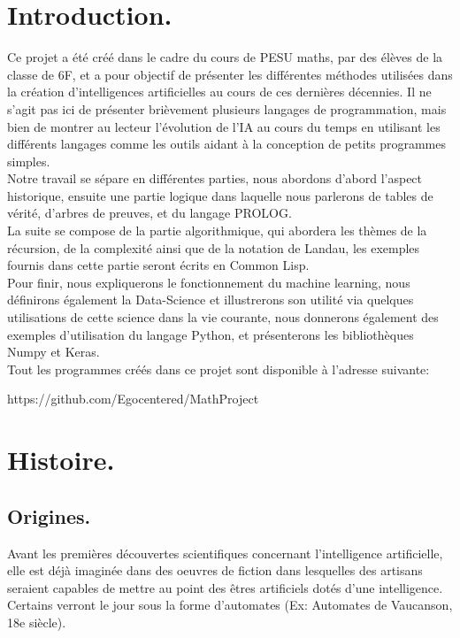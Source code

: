 \documentclass[a4paper, 12pt]{article}
\title{}
\date{}
\numberwithin{equation}{subsection}
\begin{document}
\maketitle
\thispagestyle{empty}
\newpage
\pagestyle{fancy}
\tableofcontents
\newpage
{}
\section{Introduction.}
Ce projet a été créé dans le cadre du cours de PESU maths, par des élèves de la classe de 6F, et a pour objectif de présenter les différentes méthodes utilisées dans la création d'intelligences artificielles au cours de ces dernières décennies. Il ne s'agit pas ici de présenter brièvement plusieurs langages de programmation, mais bien de montrer au lecteur l'évolution de l'IA au cours du temps en utilisant les différents langages comme les outils aidant à la conception de petits programmes simples.\\

Notre travail se sépare en différentes parties, nous abordons d'abord l'aspect historique, ensuite une partie logique dans laquelle nous parlerons de tables de vérité, d'arbres de preuves, et du langage PROLOG.\\

La suite se compose de la partie algorithmique, qui abordera les thèmes de la récursion, de la complexité ainsi que de la notation de Landau, les exemples fournis dans cette partie seront écrits en Common Lisp.\\

Pour finir, nous expliquerons le fonctionnement du machine learning, nous définirons également la Data-Science et illustrerons son utilité via quelques utilisations de cette science dans la vie courante,
nous donnerons également des exemples d'utilisation du langage Python, et présenterons les bibliothèques Numpy et Keras.\\

Tout les programmes créés dans ce projet sont disponible à l'adresse suivante: \begin{center}
  https://github.com/Egocentered/MathProject
\end{center}

\newpage
\section{Histoire.}
\subsection{Origines.}
Avant les premières découvertes scientifiques concernant l'intelligence artificielle, elle est déjà imaginée dans des oeuvres de fiction dans lesquelles des artisans seraient capables de mettre au point des êtres artificiels dotés d'une intelligence. Certains verront le jour sous la forme d'automates (Ex: Automates de Vaucanson, 18e siècle).\\
\end{document}
